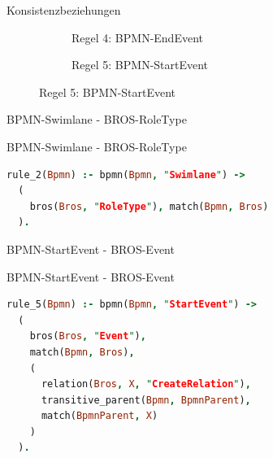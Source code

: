 \begin{frame}{Konsistenzbeziehungen}
\begin{figure}
\begin{subfigure}{0.3\textwidth}
\begin{adjustbox}{width=0.8\linewidth,center}
        \end{adjustbox}
        \caption*{\tiny{\textcolor{black!20}{Regel 4: BPMN-EndEvent}}}%
    \end{subfigure}
    \hspace{16pt}
    \begin{subfigure}{0.3\textwidth}
        \vspace{4pt}
        \centering
        \begin{adjustbox}{width=0.8\linewidth,center}
        \end{adjustbox}
        \caption*{\tiny{Regel 5: BPMN-StartEvent}}%
    \end{subfigure}
  \end{figure}
\end{frame}

\begin{frame}{BPMN-Swimlane - BROS-RoleType}
  \begin{figure}
    \centering
    \begin{adjustbox}{width=0.5\linewidth,center}
      
    \end{adjustbox}
  \end{figure}
\end{frame}
\begin{frame}[fragile]{BPMN-Swimlane - BROS-RoleType}
\begin{lstlisting}[language=Prolog]
rule_2(Bpmn) :- bpmn(Bpmn, "Swimlane") ->
  (
    bros(Bros, "RoleType"), match(Bpmn, Bros)
  ).
\end{lstlisting}
\end{frame}
\begin{frame}{BPMN-StartEvent - BROS-Event}
  \begin{figure}
    \centering
    \begin{adjustbox}{width=0.5\linewidth,center}
      
    \end{adjustbox}
  \end{figure}
\end{frame}
\begin{frame}[fragile]{BPMN-StartEvent - BROS-Event}
\begin{lstlisting}[language=Prolog]
rule_5(Bpmn) :- bpmn(Bpmn, "StartEvent") ->
  (
    bros(Bros, "Event"),
    match(Bpmn, Bros),
    (
      relation(Bros, X, "CreateRelation"),
      transitive_parent(Bpmn, BpmnParent),
      match(BpmnParent, X)
    )
  ).
\end{lstlisting}
\end{frame}